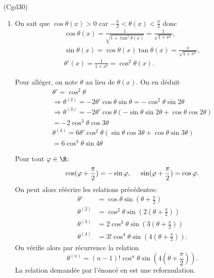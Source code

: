 \begin{tiny}(Cgd30)\end{tiny}
\begin{enumerate}
 \item On sait que $\cos \theta(x) >0$ car $-\frac{\pi}{2} < \theta(x) < \frac{\pi}{2}$ donc
\begin{multline*}
 \cos \theta(x) = \frac{1}{\sqrt{1+ \tan^2 \theta(x)}} = \frac{1}{\sqrt{1+x^2}},\\
\sin \theta(x) = \cos \theta(x) \tan \theta(x) = \frac{x}{\sqrt{1 + x^2}}, \\
\theta'(x) = \frac{1}{1+x^2} = \cos^2 \theta(x).
\end{multline*}

Pour alléger, on note $\theta$ au lieu de $\theta(x)$. On en déduit
\begin{multline*}
\theta' = \cos^2 \theta \\
\Rightarrow
\theta^{(2)} = -2 \theta'\cos \theta \sin \theta 
 = -\cos^2\theta \sin 2\theta \\
 \Rightarrow
\theta^{(3)} = - 2\theta'\cos \theta\left( -\sin \theta \sin 2\theta + \cos \theta \cos 2\theta\right) \\
 = -2 \cos^3\theta \cos 3\theta \\ 
\theta^{(4)} = 6\theta'\cos^2 \theta\left( \sin \theta \cos 3\theta + \cos \theta \sin 3\theta\right) \\
= 6 \cos^3\theta \sin 4\theta
\end{multline*}

Pour tout $\varphi \in \R$:
\begin{displaymath}
 \cos (\varphi + \frac{\pi}{2}) = - \sin \varphi,\hspace{0.5cm}
 \sin (\varphi + \frac{\pi}{2}) = \cos \varphi.
\end{displaymath}
On peut alors réécrire les relations précédentes:
\begin{align*}
\theta' &= \cos \theta \sin(\theta + \frac{\pi}{2})\\
\theta^{(2)} &= \cos^2 \theta \sin \left( 2(\theta + \frac{\pi}{2})\right) \\ 
\theta^{(3)} &= 2 \cos^3 \theta \sin \left( 3(\theta + \frac{\pi}{2})\right) \\
\theta^{(4)} &= 3! \cos^4 \theta \sin \left( 4(\theta + \frac{\pi}{2})\right).
\end{align*}
On vérifie alors par récurrence la relation
\begin{displaymath}
 \theta^{(n)} = (n-1)! \cos^{n}\theta \sin\left( 4(\theta + \frac{\pi}{2})\right).
\end{displaymath}
La relation demandée par l'énoncé en est une reformulation.


\end{enumerate}
